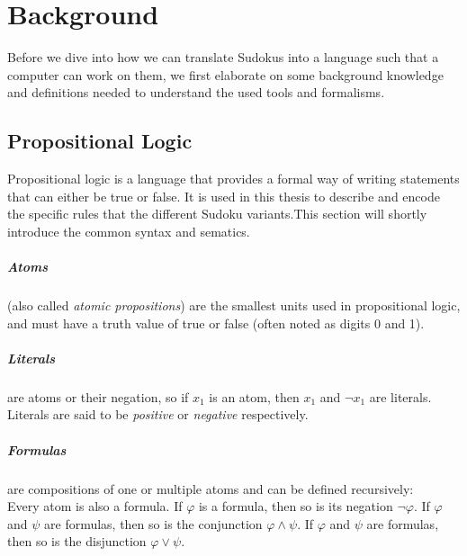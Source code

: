 
\chapter{Background}
Before we dive into how we can translate Sudokus into a language such that a computer can work on them, we first elaborate on some background knowledge and definitions needed to understand the used tools and formalisms.

\section{Propositional Logic}
Propositional logic is a language that provides a formal way of writing statements that can either be true or false. It is used in this thesis to describe and encode the specific rules that the different Sudoku variants.This section will shortly introduce the common syntax and sematics.

\paragraph{Atoms}
(also called \emph{atomic propositions}) are the smallest units used in propositional logic, and must have a truth value of true or false (often noted as digits 0 and 1).

\paragraph{Literals}
are atoms or their negation, so if $x_1$ is an atom, then $x_1$ and $\neg x_1$ are literals. Literals are said to be \emph{positive} or \emph{negative} respectively.


\paragraph{Formulas} are compositions of one or multiple atoms and can be defined recursively:\\
Every atom is also a formula.
If $\varphi$ is a formula, then so is its negation $\neg\varphi$.
If $\varphi$ and $\psi$ are formulas, then so is the conjunction $\varphi \land \psi$.
If $\varphi$ and $\psi$ are formulas, then so is the disjunction $\varphi \lor \psi$.


